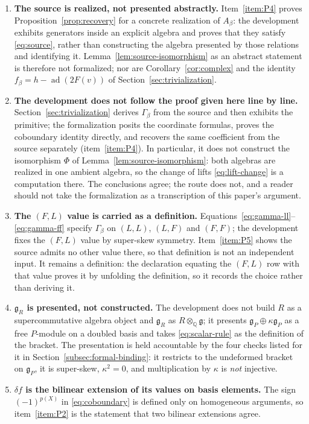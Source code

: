 \documentclass[11pt]{article}
\numberwithin{equation}{section}
\theoremstyle{remark}
\begin{document}
\begin{enumerate}
\item\label{item:not-source-iso} \textbf{The source is realized, not presented
abstractly.} Item~\ref{item:P4} proves Proposition~\ref{prop:recovery} for a
concrete realization of $A_\beta$: the development exhibits generators inside
an explicit algebra and proves that they satisfy \eqref{eq:source}, rather than
constructing the algebra presented by those relations and identifying it.
Lemma~\ref{lem:source-isomorphism} as an abstract statement is therefore not
formalized; nor are Corollary~\ref{cor:complex} and the identity
$f_\beta=h-\operatorname{ad}(2F(v))$ of Section~\ref{sec:trivialization}.

\item\label{item:not-route} \textbf{The development does not follow the proof
given here line by line.} Section~\ref{sec:trivialization} derives
$\Gamma_\beta$ from the source and then exhibits the primitive; the
formalization posits the coordinate formulas, proves the coboundary identity
directly, and recovers the same coefficient from the source separately
(item~\ref{item:P4}). In particular, it does not construct the isomorphism
$\Phi$ of Lemma~\ref{lem:source-isomorphism}: both algebras are realized in one
ambient algebra, so the change of lifts \eqref{eq:lift-change} is a computation
there. The conclusions agree;
the route does not, and a reader should not take the formalization as a
transcription of this paper's argument.

\item\label{item:not-FL} \textbf{The $(F,L)$ value is carried as a definition.}
Equations~\eqref{eq:gamma-ll}--\eqref{eq:gamma-ff} specify $\Gamma_\beta$ on
$(L,L)$, $(L,F)$ and $(F,F)$; the development fixes the $(F,L)$ value by
super-skew symmetry. Item~\ref{item:P5} shows the source admits no other value
there, so that definition is not an independent input. It remains a definition:
the declaration equating the $(F,L)$ row with that value proves it by unfolding
the definition, so it records the choice rather than deriving it.

\item\label{item:not-gR} \textbf{$\mathfrak g_R$ is presented, not
constructed.} The development does not build $R$ as a supercommutative algebra
object and $\mathfrak g_R$ as $R\otimes_{\mathbb Q}\mathfrak g$; it presents
$\mathfrak g_P\oplus\kappa\mathfrak g_P$ as a free $P$-module on a doubled
basis and takes \eqref{eq:scalar-rule} as the definition of the bracket. The
presentation is held accountable by the four checks listed for it in
Section~\ref{subsec:formal-binding}: it restricts to the undeformed bracket on
$\mathfrak g_P$, it is super-skew, $\kappa^2=0$, and multiplication by
$\kappa$ is \emph{not} injective.

\item\label{item:not-delta} \textbf{$\delta f$ is the bilinear extension of its
values on basis elements.} The sign $(-1)^{p(X)}$ in \eqref{eq:coboundary} is
defined only on homogeneous arguments, so item~\ref{item:P2} is the statement
that two bilinear extensions agree.
\end{enumerate}
\end{document}

